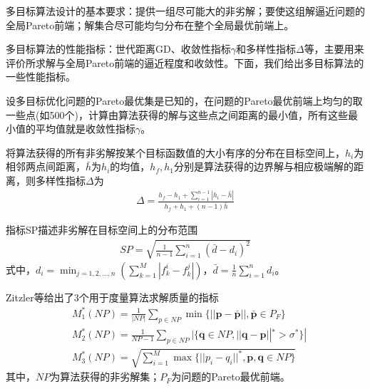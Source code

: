             \par
            多目标算法设计的基本要求：提供一组尽可能大的非劣解；要使这组解逼近问题的全局Pareto前端；解集合尽可能均匀分布在整个全局最优前端上。
            \par
            多目标算法的性能指标：世代距离GD、收敛性指标$\gamma$和多样性指标$\Delta$等，主要用来评价所求解与全局Pareto前端的逼近程度和收敛性。下面，我们给出多目标算法的一些性能指标。
            \begin{definition}[收敛性指标]
            设多目标优化问题的Pareto最优集是已知的，在问题的Pareto最优前端上均匀的取一些点(如500个)，计算由算法获得的解与这些点之间距离的最小值，所有这些最小值的平均值就是收敛性指标$\gamma$。
            \end{definition}
            \begin{definition}[多样性指标]
            将算法获得的所有非劣解按某个目标函数值的大小有序的分布在目标空间上，$h_i$为相邻两点间距离，$\bar{h}$为$h_i$的均值，$h_f,h_1$分别是算法获得的边界解与相应极端解的距离，则多样性指标$\Delta$为
            \begin{align*}
            \Delta = \frac{h_f - h_1+\sum_{i=1}^{n-1}|h_i - \bar{h}|}{h_f+h_1+(n-1)\bar{h}}
            \end{align*}
            \end{definition}
            \begin{definition}[SP指标]
            指标SP描述非劣解在目标空间上的分布范围
            \begin{align*}
            SP = \sqrt{\frac{1}{n-1}\sum_{i=1}^n(\bar{d}-d_i)^2}
            \end{align*}
            式中，$d_i = \min_{j=1,2,\dots,n}\left( \sum_{k=1}^M|f_k^i - f_k^j| \right) $，$\bar{d} = \frac{1}{n}\sum_{i=1}^nd_i$。
            \end{definition}
            \begin{definition}
            Zitzler等给出了3个用于度量算法求解质量的指标
            \begin{align*}
            & M_1^*(NP) = \frac{1}{|NP|}\sum_{p\in NP}\min\{||\mathbf{p}-\bar{\mathbf{p}}||,\bar{\mathbf{p}}\in P_F\}\\
            & M_2^*(NP) = \frac{1}{NP-1}\sum_{p\in NP} |\{\mathbf{q}\in NP,||\mathbf{q}-\mathbf{p}||^* >\sigma ^*  \}|\\
            & M_3^*(NP) = \sqrt{\sum_{i=1}^M\max\{||p_i-q_i||^*,\mathbf{p},\mathbf{q}\in NP\}}
            \end{align*}
            其中，$NP$为算法获得的非劣解集；$P_F$为问题的Pareto最优前端。
            \end{definition}
